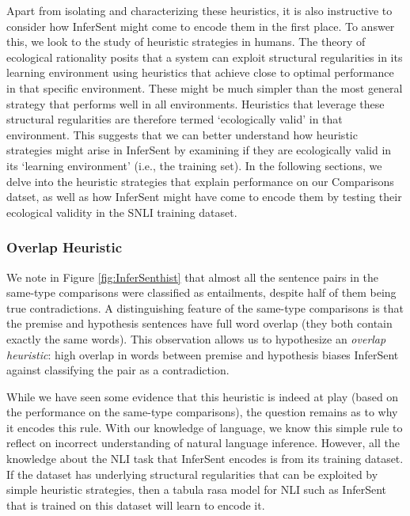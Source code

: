 Apart from isolating and characterizing these heuristics, it is also instructive to consider how InferSent might come to encode them in the first place. To answer this, we look to the study of heuristic strategies in humans. The theory of ecological rationality \citep{todd2007environments, simon1991bounded} posits that a system can exploit structural regularities in its learning environment using heuristics that achieve close to optimal performance in that specific environment. These might be much simpler than the most general strategy that performs well in all environments. Heuristics that leverage these structural regularities are therefore termed `ecologically valid' in that environment. This suggests that we can better understand how heuristic strategies might arise in InferSent by examining if they are ecologically valid in its `learning environment' (i.e., the training set). In the following sections, we delve into the heuristic strategies that explain performance on our Comparisons datset, as well as how InferSent might have come to encode them by testing their ecological validity in the SNLI training dataset.

\subsubsection{Overlap Heuristic}
We note in Figure \ref{fig:InferSenthist} that almost all the sentence pairs in the same-type comparisons were classified as entailments, despite half of them being true contradictions. A distinguishing feature of the same-type comparisons is that the premise and hypothesis sentences have full word overlap (they both contain exactly the same words). This observation allows us to hypothesize an \textit{overlap heuristic}: high overlap in words between premise and hypothesis biases InferSent against classifying the pair as a contradiction.

While we have seen some evidence that this heuristic is indeed at play (based on the performance on the same-type comparisons), the question remains as to why it encodes this rule. With our knowledge of language, we know this simple rule to reflect on incorrect understanding of natural language inference. However, all the knowledge about the NLI task that InferSent encodes is from its training dataset. If the dataset has underlying structural regularities that can be exploited by simple heuristic strategies, then a tabula rasa model for NLI such as InferSent that is trained on this dataset will learn to encode it.

